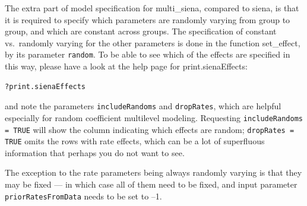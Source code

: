 \documentclass[a4paper,fleqn,11pt]{article}
\newcommand{\+}{\, + \,}
\newcommand{\sfn}[1]{\textsf{#1}}
\begin{document}
The extra part of model specification for \textsf{multi\_siena},
compared to \textsf{siena},
is that it is required to specify which parameters are
randomly varying from group to group, and which are constant across groups.
The specification of constant vs.\ randomly varying
for the other parameters is done in the function
\textsf{set\_effect}, by its parameter \texttt{random}.
To be able to see which of the effects are specified in this way,
please have a look at the help page for \sfn{print.sienaEffects}:
\begin{verbatim}
?print.sienaEffects
\end{verbatim}
and note the parameters \texttt{includeRandoms}
and \texttt{dropRates}, which are helpful especially for
random coefficient multilevel modeling.
Requesting \texttt{includeRandoms = TRUE} will show the column indicating
which effects are random; \texttt{dropRates = TRUE} omits the
rows with rate effects, which can be a lot of superfluous information
that perhaps you do not want to see.

The exception to the rate parameters being always randomly varying
is that they may be fixed --- in which case all of them need to be fixed,
and input parameter \\
\texttt{priorRatesFromData} needs to be set to --1.
\medskip
\end{document}
